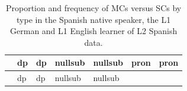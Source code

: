 \documentclass[
  letterpaper,
  DIV=11,
  numbers=noendperiod]{scrartcl}
\begin{document}
\begin{longtable}[]{@{}
  >{\raggedright\arraybackslash}p{}
  >{\centering\arraybackslash}p{}
  >{\centering\arraybackslash}p{}
  >{\centering\arraybackslash}p{}
  >{\centering\arraybackslash}p{}
  >{\centering\arraybackslash}p{}
  >{\centering\arraybackslash}p{}@{}}
\caption{Proportion and frequency of MCs versus SCs by type in the
Spanish native speaker, the L1 German and L1 English learner of L2
Spanish data.}\label{tbl-clause-type-L2English}\tabularnewline
\toprule\noalign{}
\begin{minipage}[b]{\linewidth}\raggedright
\end{minipage} & \begin{minipage}[b]{\linewidth}\centering
dp
\end{minipage} & \begin{minipage}[b]{\linewidth}\centering
dp
\end{minipage} & \begin{minipage}[b]{\linewidth}\centering
nullsub
\end{minipage} & \begin{minipage}[b]{\linewidth}\centering
nullsub
\end{minipage} & \begin{minipage}[b]{\linewidth}\centering
pron
\end{minipage} & \begin{minipage}[b]{\linewidth}\centering
pron
\end{minipage} \\
\midrule\noalign{}
\endfirsthead
\toprule\noalign{}
\begin{minipage}[b]{\linewidth}\raggedright
\end{minipage} & \begin{minipage}[b]{\linewidth}\centering
dp
\end{minipage} & \begin{minipage}[b]{\linewidth}\centering
dp
\end{minipage} & \begin{minipage}[b]{\linewidth}\centering
nullsub
\end{minipage} & \begin{minipage}[b]{\linewidth}\centering
nullsub
\end{minipage} & \begin{minipage}[b]{\linewidth}\centering

\end{minipage}
\end{longtable}
\end{document}

